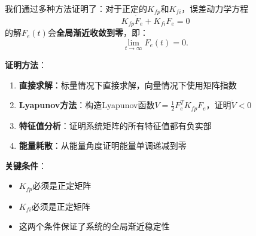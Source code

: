 \documentclass{article}
\begin{document}
我们通过多种方法证明了：对于正定的$K_{fp}$和$K_{fi}$，误差动力学方程
\begin{equation}
K_{fp}\dot{F}_e + K_{fi}F_e = 0
\end{equation}
的解$F_e(t)$会\textbf{全局渐近收敛到零}，即：
\begin{equation}
\lim_{t \to \infty} F_e(t) = 0.
\end{equation}

\textbf{证明方法}：
\begin{enumerate}
\item \textbf{直接求解}：标量情况下直接求解，向量情况下使用矩阵指数
\item \textbf{Lyapunov方法}：构造Lyapunov函数$V = \frac{1}{2}F_e^T K_{fp}F_e$，证明$\dot{V} < 0$
\item \textbf{特征值分析}：证明系统矩阵的所有特征值都有负实部
\item \textbf{能量耗散}：从能量角度证明能量单调递减到零
\end{enumerate}

\textbf{关键条件}：
\begin{itemize}
\item $K_{fp}$必须是正定矩阵
\item $K_{fi}$必须是正定矩阵
\item 这两个条件保证了系统的全局渐近稳定性
\end{itemize}
\end{document}

